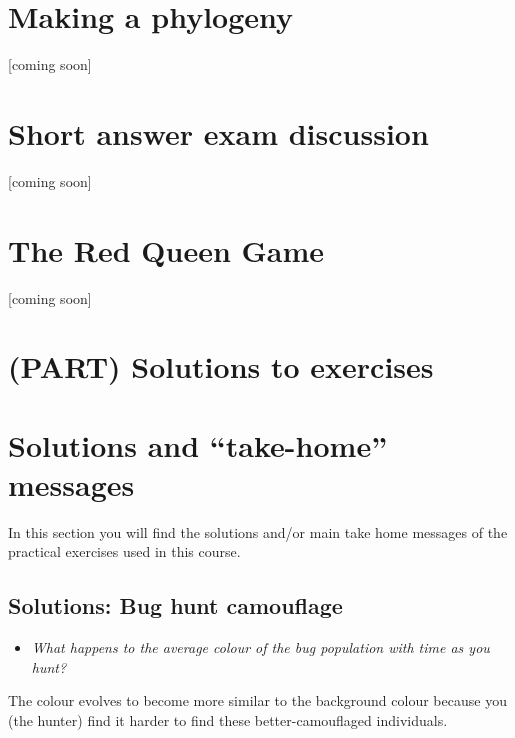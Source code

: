 \documentclass[
  a4paper]{book}
\providecommand{\tightlist}{%
  \setlength{\itemsep}{0pt}\setlength{\parskip}{0pt}}
\begin{document}
\hypertarget{making-a-phylogeny}{%
\chapter{Making a phylogeny}\label{making-a-phylogeny}}

{[}coming soon{]}

\hypertarget{short-answer-exam-discussion}{%
\chapter{Short answer exam
discussion}\label{short-answer-exam-discussion}}

{[}coming soon{]}

\hypertarget{the-red-queen-game}{%
\chapter{The Red Queen Game}\label{the-red-queen-game}}

{[}coming soon{]}

\hypertarget{part-solutions-to-exercises}{%
\chapter*{(PART) Solutions to
exercises}\label{part-solutions-to-exercises}}

\hypertarget{solutions-and-take-home-messages}{%
\chapter{Solutions and ``take-home''
messages}\label{solutions-and-take-home-messages}}

In this section you will find the solutions and/or main take home
messages of the practical exercises used in this course.

\hypertarget{solutions-bug-hunt-camouflage}{%
\section{Solutions: Bug hunt
camouflage}\label{solutions-bug-hunt-camouflage}}

\begin{itemize}
\tightlist
\item
  \emph{What happens to the average colour of the bug population with
  time as you hunt?}
\end{itemize}

The colour evolves to become more similar to the background colour
because you (the hunter) find it harder to find these better-camouflaged
individuals.
\end{document}
